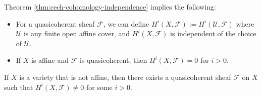 \begin{remark}
  Theorem \ref{thm:cech-cohomology-independence} implies
  the following:
  \begin{itemize}
    \item For a quasicoherent
      sheaf $\mathcal{F}$,
      we can define $H^i(X, \mathcal{F}) := H^i(\mathcal{U}, \mathcal{F})$
      where $\mathcal{U}$ is any finite
      open affine cover, and
      $H^i(X, \mathcal{F})$ is
      independent of the choice of
      $\mathcal{U}$.
    \item If $X$ is affine and
      $\mathcal{F}$ is quasicoherent, then
      $H^i(X, \mathcal{F}) = 0$ for $i > 0$.
  \end{itemize}
\end{remark}

\begin{theorem}[Serre]
  If $X$ is a variety that is not affine,
  then there exists a quasicoherent
  sheaf $\mathcal{F}$ on $X$ such that
  $H^i(X, \mathcal{F}) \ne 0$ for some
  $i > 0$.
\end{theorem}
